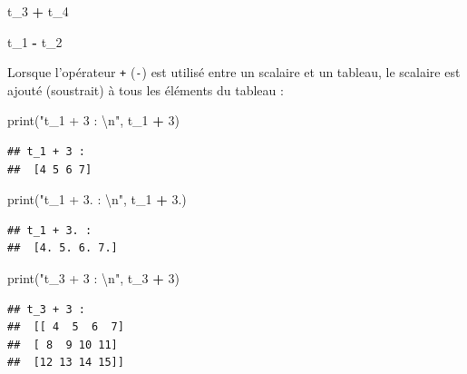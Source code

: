\documentclass[12pt,]{book}
\newenvironment{Shaded}{\begin{snugshade}}{\end{snugshade}}
\newcommand{\DecValTok}[1]{\textcolor[rgb]{0.00,0.00,0.81}{#1}}
\newcommand{\CharTok}[1]{\textcolor[rgb]{0.31,0.60,0.02}{#1}}
\newcommand{\StringTok}[1]{\textcolor[rgb]{0.31,0.60,0.02}{#1}}
\newcommand{\OperatorTok}[1]{\textcolor[rgb]{0.81,0.36,0.00}{\textbf{#1}}}
\newcommand{\BuiltInTok}[1]{#1}
\newcommand{\NormalTok}[1]{#1}
\numberwithin{equation}{section}
\numberwithin{countremarque}{section}
\begin{document}
\begin{Shaded}
\begin{Highlighting}[]
\NormalTok{t_3 }\OperatorTok{+}\NormalTok{ t_4}
\end{Highlighting}
\end{Shaded}

\begin{Shaded}
\begin{Highlighting}[]
\NormalTok{t_1 }\OperatorTok{-}\NormalTok{ t_2}
\end{Highlighting}
\end{Shaded}

Lorsque l'opérateur \texttt{+} (\texttt{-}) est utilisé entre un
scalaire et un tableau, le scalaire est ajouté (soustrait) à tous les
éléments du tableau :

\begin{Shaded}
\begin{Highlighting}[]
\BuiltInTok{print}\NormalTok{(}\StringTok{"t_1 + 3 : }\CharTok{\textbackslash{}n}\StringTok{"}\NormalTok{, t_1 }\OperatorTok{+} \DecValTok{3}\NormalTok{)}
\end{Highlighting}
\end{Shaded}

\begin{lstlisting}
## t_1 + 3 : 
##  [4 5 6 7]
\end{lstlisting}

\begin{Shaded}
\begin{Highlighting}[]
\BuiltInTok{print}\NormalTok{(}\StringTok{"t_1 + 3. : }\CharTok{\textbackslash{}n}\StringTok{"}\NormalTok{, t_1 }\OperatorTok{+} \DecValTok{3}\NormalTok{.)}
\end{Highlighting}
\end{Shaded}

\begin{lstlisting}
## t_1 + 3. : 
##  [4. 5. 6. 7.]
\end{lstlisting}

\begin{Shaded}
\begin{Highlighting}[]
\BuiltInTok{print}\NormalTok{(}\StringTok{"t_3 + 3 : }\CharTok{\textbackslash{}n}\StringTok{"}\NormalTok{, t_3 }\OperatorTok{+} \DecValTok{3}\NormalTok{)}
\end{Highlighting}
\end{Shaded}

\begin{lstlisting}
## t_3 + 3 : 
##  [[ 4  5  6  7]
##  [ 8  9 10 11]
##  [12 13 14 15]]
\end{lstlisting}
\end{document}
